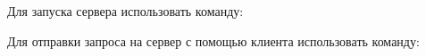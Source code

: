 Для запуска сервера использовать команду\+: 
\begin{DoxyCode}{0}

\end{DoxyCode}
 Для отправки запроса на сервер с помощью клиента использовать команду\+: 
\begin{DoxyCode}{0}

\end{DoxyCode}
 